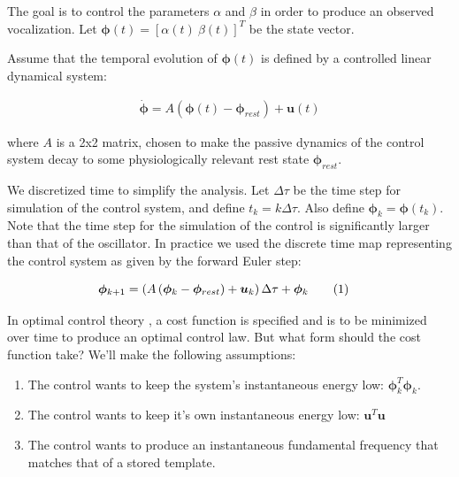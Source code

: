 \documentclass{article} %
\newcommand\numberthis{\addtocounter{equation}{1}\tag{\theequation}}
\begin{document}
The goal is to control the parameters $\alpha$ and $\beta$ in order to produce an observed
vocalization. Let $\bm{\phi}(t) = \left[ \alpha(t) ~ \beta(t) \right]^T$ be the state vector.

Assume that the temporal evolution of $\bm{\phi}(t)$ is defined by a controlled linear dynamical
system:

\begin{align*}
\dot{\bm{\phi}}=A(\bm{\phi}(t) - \bm{\phi}_{rest}) + \bm{u}(t)
\end{align*}

where $A$ is a 2x2 matrix, chosen to make the passive dynamics of the control system decay
to some physiologically relevant rest state $\bm{\phi}_{rest}$.

We discretized time to simplify the analysis. Let $\Delta\tau$ be the time step for
simulation of the control system, and define $t_k = k\Delta\tau$. Also define
$\bm{\phi}_k = \bm{\phi}(t_k)$. Note that the time step for the simulation of the
control is significantly larger than that of the oscillator. In practice we used the
discrete time map representing the control system as given by the forward Euler step:

\begin{align*}
\bm{\phi}_{k+1} &= \begin{aligned}\left( A \left( \bm{\phi}_k - \bm{\phi}_{rest} \right) + \bm{u}_k \right) \Delta\tau + \bm{\phi}_{k}\end{aligned} \numberthis \label{eq_control}
\end{align*}

In optimal control theory \cite{Todorov2002}, a cost function is specified and is to be minimized over time to
produce an optimal control law. But what form should the cost function take? We'll make
the following assumptions:

\begin{enumerate}

\item The control wants to keep the system's instantaneous energy low: $\bm{\phi}_k^T \bm{\phi}_k$.
\item The control wants to keep it's own instantaneous energy low: $\bm{u}^T \bm{u}$ 
\item The control wants to produce an instantaneous fundamental frequency that matches that of a stored template.

\end{enumerate}
\end{document}
